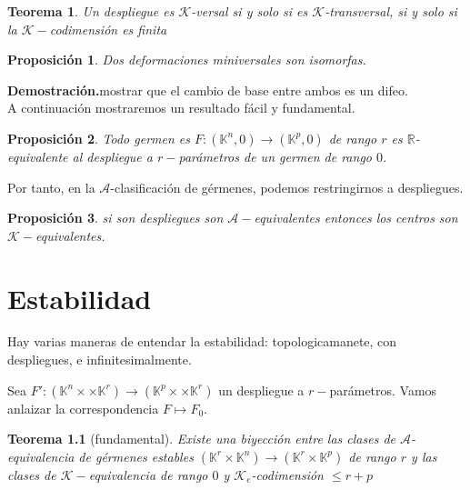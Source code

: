 \documentclass[12pt]{book}
\newtheorem{teo}{Teorema}
\newtheorem{pro}{Proposición}
\newcommand{\re}{\mathbb{R}}
\newcommand{\kg}{\mathcal{K}}
\newcommand{\kp}{(\mathbb{K}^p,0)}
\newcommand{\ag}{\mathcal{A}}
\newcommand{\dem}{\textbf{Demostración.}}
\newcommand{\kn}{(\mathbb{K}^n,0)}
\begin{document}


\begin{teo}
Un despliegue es $\kg$-versal si y solo si es $\kg$-transversal, si y solo si la $\mathcal{K}-$codimensión es finita
\end{teo}

\begin{pro}
Dos deformaciones miniversales son isomorfas.
\end{pro}
\dem mostrar que el cambio de base entre ambos es un difeo.\\


A continuación mostraremos un resultado fácil y fundamental. 

\begin{pro}
	Todo germen es $F:\kn \rightarrow\kp$ de rango $r$ es $\re$-equivalente al despliegue a $r-$parámetros de un germen de rango $0$.  
\end{pro}


Por tanto, en la $\ag$-clasificación de gérmenes, podemos restringirnos a despliegues.

\begin{pro}
si son despliegues son $\ag-$equivalentes entonces los centros son $\kg-$equivalentes.
\end{pro}







\chapter{Estabilidad}


Hay varias maneras de entendar la estabilidad: topologicamanete, con despliegues, e infinitesimalmente.

Sea $F': (\mathbb{K}^n \times \times \mathbb{K}^r) \rightarrow (\mathbb{K}^p \times \times \mathbb{K}^r)  $ un despliegue a $r-$parámetros. Vamos anlaizar la correspondencia $F \mapsto F_0$.

\begin{teo}[fundamental]
	Existe una biyección entre las clases de $\ag$-equivalencia de gérmenes estables $(\mathbb{K}^r \times \mathbb{K}^n) \rightarrow (\mathbb{K}^r \times \mathbb{K}^p)$ de rango $r$ y las clases de $\kg-$equivalencia de rango $0$ y $\kg _e$-codimensión $\leq r+p$
\end{teo}
\end{document}
